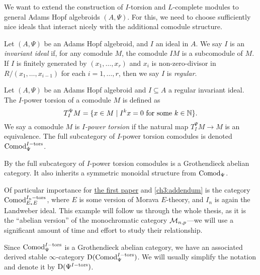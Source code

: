 We want to extend the construction of $I$-torsion and $L$-complete modules to general Adams Hopf algebroids $(A,\Psi)$. For this, we need to choose sufficiently nice ideals that interact nicely with the additional comodule structure. 

\begin{definition}
    Let $(A, \Psi)$ be an Adams Hopf algebroid, and $I$ an ideal in $A$. We say $I$ is an \emph{invariant ideal} if, for any comodule $M$, the comodule $IM$ is a subcomodule of $M$. If $I$ is finitely generated by $(x_1, \ldots, x_r)$ and $x_i$ is non-zero-divisor in $R/(x_1, \ldots, x_{i-1})$ for each $i=1, \ldots, r$, then we say $I$ is \emph{regular}. 
\end{definition}

\begin{definition}
    \label{ch0:def:I-power-torsion-comodule}
    Let $(A,\Psi)$ be an Adams Hopf algebroid and $I\subseteq A$ a regular invariant ideal. The $I$-power torsion of a comodule $M$ is defined as 
    \[T_I^\Psi M = \{x\in M \mid I^kx = 0 \text{ for some } k\in \mathbb{N}\}.\]
    We say a comodule $M$ is \emph{$I$-power torsion} if the natural map $T_I^\Psi M\longrightarrow M$ is an equivalence. The full subcategory of $I$-power torsion comodules is denoted $\mathrm{Comod}_\Psi^{I-\mathrm{tors}}$. 
\end{definition}

\begin{remark}
    \label{ch0:rm:torsion-comodules-grothendieck-monoidal}
    By \cite[5.10]{barthel-heard-valenzuela_2018} the full subcategory of $I$-power torsion comodules is a Grothendieck abelian category. It also inherits a symmetric monoidal structure from $\mathrm{Comod}_\Psi$.
\end{remark}

\begin{example}
    Of particular importance for \hyperref[ch1]{the first paper} and \cref{ch3:addendum} is the category $\mathrm{Comod}_{E_*E}^{I_n-\mathrm{tors}}$, where $E$ is some version of Morava $E$-theory, and $I_n$ is again the Landweber ideal. This example will follow us through the whole thesis, as it is the ``abelian version'' of the monochromatic category $\mathcal{M}_{n,p}$---we will use a significant amount of time and effort to study their relationship. 
\end{example}

\begin{notation}
    Since $\mathrm{Comod}_\Psi^{I-\mathrm{tors}}$ is a Grothendieck abelian category, we have an associated derived stable $\infty$-category $\mathrm{D}(\mathrm{Comod}_\Psi^{I-\mathrm{tors}})$. We will usually simplify the notation and denote it by $\mathrm{D}(\Psi^{I-\mathrm{tors}})$.
\end{notation}


